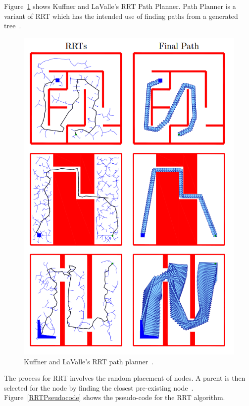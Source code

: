 \documentclass[journal]{IEEEtran}
\begin{document}
Figure~\ref{KuffnerRRT} shows  Kuffner and LaValle's RRT Path Planner. Path Planner is a variant of RRT which has the intended use of finding paths from a generated tree~\cite{Kuffner2000}.
\begin{figure}[h]
	\includegraphics[width=1.0\linewidth]{KuffnerRRT.png}
	\caption{ Kuffner and LaValle's RRT path planner~\cite{Kuffner2000}.}
	\label{KuffnerRRT}
\end{figure} 

The process for RRT involves the random placement of nodes. A parent is then selected for the node by finding the closest pre-existing node~\cite{Kuffner2000}. Figure~\ref{RRTPseudocode} shows the pseudo-code for the RRT algorithm. 
\end{document}
